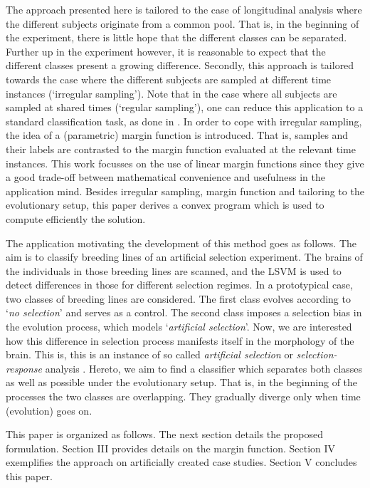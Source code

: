 \documentclass[12pt,a4paper]{article}%
\begin{document}
The approach presented here is tailored to the case of longitudinal analysis where
the different subjects originate from a common pool. That is, in the beginning of the experiment,
there is little hope that the different classes can be separated. Further up in the experiment  however,
it is reasonable to expect that the different classes present a growing difference.
Secondly, this approach is tailored towards the case where the different subjects are sampled at different time instances (`irregular sampling').
Note that in the case where all subjects are sampled at shared times (`regular sampling'),
one can reduce this application to a standard classification task, as done in \cite{chen2011lsvc}.
In order to cope with irregular sampling, the idea of a (parametric) margin function is introduced.
That is, samples and their labels are contrasted to the margin function evaluated at the relevant time instances.
This work focusses on the use of linear margin functions since they give a good trade-off between mathematical convenience and usefulness in the application mind.
Besides irregular sampling, margin function and tailoring to the evolutionary setup, this paper derives a convex program which is used to compute efficiently the solution.


The application motivating the development of this method goes as follows.
The aim is to classify breeding lines of an artificial selection experiment.
The brains of the individuals in those breeding lines are scanned, and the LSVM is used to detect differences in those for different selection regimes.
In a prototypical case, two classes of breeding lines are considered.
The first class evolves according to `{\em no selection}' and serves as a control.
The second class imposes a selection bias in the evolution process, which models `{\em artificial selection}'.
Now, we are interested how this difference in selection process manifests itself in the morphology of the brain.
This is, this is an instance of so called {\em artificial selection} or {\em selection-response} analysis \cite{falconer1996introduction}.
Hereto, we aim to find a classifier which separates both classes as well as possible under the evolutionary setup.
That is, in the beginning of the processes the two classes are overlapping.
They gradually diverge only when time (evolution) goes on.


This paper is organized as follows.
The next section details the proposed formulation.
Section III provides details on the margin function.
Section IV exemplifies the approach on artificially created case studies.
Section V concludes this paper.
\end{document}
